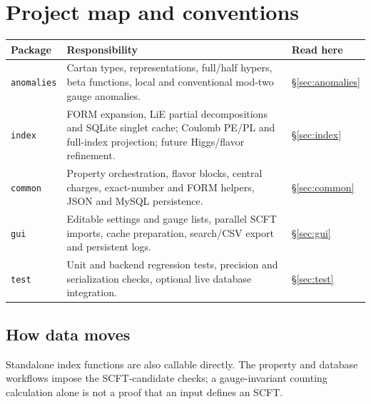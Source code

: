 \documentclass[11pt,a4paper]{article}
\numberwithin{equation}{section}
\newcommand{\code}[1]{{\small\nolinkurl{#1}}}
\begin{document}
\section{Project map and conventions}\label{sec:map}
\begin{tabularx}{\textwidth}{@{}p{25mm}Yp{21mm}@{}}
\toprule
Package & Responsibility & Read here\\\midrule
\code{anomalies} & Cartan types, representations, full/half hypers, beta functions,
local and conventional mod-two gauge anomalies. & \S\ref{sec:anomalies}\\
\code{index} & FORM expansion, LiE partial decompositions and SQLite singlet cache; Coulomb PE/PL and
full-index projection; future Higgs/flavor refinement. & \S\ref{sec:index}\\
\code{common} & Property orchestration, flavor blocks, central charges, exact-number
and FORM helpers, JSON and MySQL persistence. & \S\ref{sec:common}\\
\code{gui} & Editable settings and gauge lists, parallel SCFT imports,
cache preparation, search/CSV export and persistent logs. & \S\ref{sec:gui}\\
\code{test} & Unit and backend regression tests, precision and serialization checks,
optional live database integration. & \S\ref{sec:test}\\\bottomrule
\end{tabularx}

\subsection*{How data moves}
\begin{center}
\end{center}
Standalone index functions are also callable directly. The property and database
workflows impose the SCFT-candidate checks; a gauge-invariant counting calculation
alone is not a proof that an input defines an SCFT.
\end{document}

